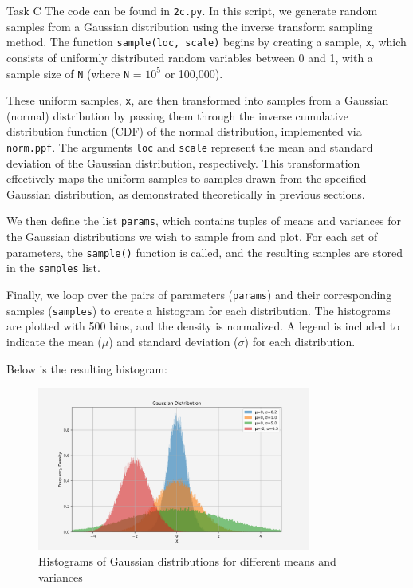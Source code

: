 \begin{task}{Task C}
	The code can be found in \texttt{2c.py}. In this script, we generate
	random samples from a Gaussian distribution using the inverse transform
	sampling method. The function \texttt{sample(loc, scale)} begins by
	creating a sample, \texttt{x}, which consists of uniformly distributed
	random variables between 0 and 1, with a sample size of \texttt{N}
	(where \texttt{N} = $10^5$ or 100,000).

	These uniform samples, \texttt{x}, are then transformed into samples
	from a Gaussian (normal) distribution by passing them through the
	inverse cumulative distribution function (CDF) of the normal
	distribution, implemented via \texttt{norm.ppf}. The arguments
	\texttt{loc} and \texttt{scale} represent the mean and standard
	deviation of the Gaussian distribution, respectively. This
	transformation effectively maps the uniform samples to samples drawn
	from the specified Gaussian distribution, as demonstrated theoretically
	in previous sections.

	We then define the list \texttt{params}, which contains tuples of means
	and variances for the Gaussian distributions we wish to sample from and
	plot. For each set of parameters, the \texttt{sample()} function is
	called, and the resulting samples are stored in the \texttt{samples}
	list.

	Finally, we loop over the pairs of parameters (\texttt{params}) and
	their corresponding samples (\texttt{samples}) to create a histogram
	for each distribution. The histograms are plotted with 500 bins, and
	the density is normalized. A legend is included to indicate the mean
	(\texttt{$\mu$}) and standard deviation (\texttt{$\sigma$}) for each
	distribution.

	Below is the resulting histogram:
	\begin{figure}[H]
		\centering
		\includegraphics[width=0.8\textwidth]{../images/2c.png}
		\caption{Histograms of Gaussian distributions for different
			means and variances}
		\label{fig:gaussian_hist}
	\end{figure}
\end{task}

